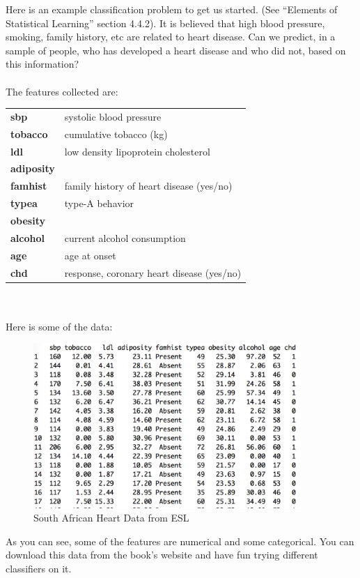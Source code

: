\documentclass[11pt]{article}
\begin{document}
  Here is an example classification problem to get us started.
  (See ``Elements of Statistical Learning'' section 4.4.2). It is believed that
  high blood pressure, smoking, family history, etc are related to heart
  disease. Can we predict, in a sample of people, who has developed a heart
  disease and who did not, based on this information? 
\\~\\
The features collected are:
\begin{table}[h!]
    \centering
    \begin{tabular}{l l}
      {\bf 	sbp	} & systolic blood pressure\\
      {\bf 	tobacco	} & cumulative tobacco (kg)\\
      {\bf 	ldl	} &low density lipoprotein cholesterol\\
      {\bf 	adiposity	} & \\
      {\bf 	famhist	} & family history of heart disease (yes/no)\\
      {\bf 	typea	} & type-A behavior\\
      {\bf 	obesity	} & \\
      {\bf 	alcohol	} & current alcohol consumption\\
      {\bf 	age	} & age at onset\\
      {\bf 	chd	} & response, coronary heart disease (yes/no)\\
    \end{tabular}
  \end{table}
\\~\\ Here is some of the data:
\begin{figure}[h!]
      \centering
      \includegraphics[width=4in]{SAheart_data}
      \caption{South African Heart Data from ESL}
    \end{figure}

    As you can see, some of the features are numerical and some categorical. You can
download this data from the book's website and have fun trying different
classifiers on  it.
\end{document}
